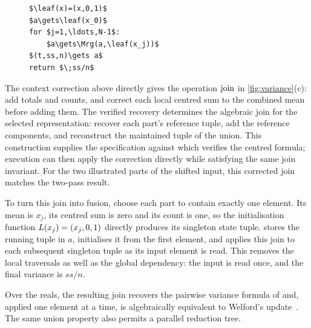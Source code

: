 \begin{figure}
\begin{lstlisting}[style=pseudocode,caption={Single pass with maintained states.},label={lst:variance-after}]
$\leaf(x)=(x,0,1)$
$a\gets\leaf(x_0)$
for $j=1,\ldots,N-1$:
    $a\gets\Mrg(a,\leaf(x_j))$
$(t,ss,n)\gets a$
return $\;ss/n$
\end{lstlisting}
\end{figure}
The context correction above directly gives the operation $\operatorname{join}$ in \cref{fig:variance}(c): add totals and counts, and correct each local centred sum to the combined mean before adding them.
The verified recovery determines the algebraic join for the selected representation: recover each part's reference tuple, add the reference components, and reconstruct the maintained tuple of the union.
This construction supplies the specification against which \sys verifies the centred formula; execution can then apply the correction directly while satisfying the same join invariant.
For the two illustrated parts of the shifted input, this corrected join matches the two-pass result.

To turn this join into fusion, choose each part to contain exactly one element.
Its mean is $x_j$, its centred sum is zero and its count is one, so the initialisation function $L(x_j)=(x_j,0,1)$ directly produces its singleton state tuple.
 stores the running tuple in $a$, initialises it from the first element, and applies this join to each subsequent singleton tuple as its input element is read.
This removes the local traversals as well as the global dependency: the input is read once, and the final variance is $ss/n$.

Over the reals, the resulting join recovers the pairwise variance formula of \citet{chan} and, applied one element at a time, is algebraically equivalent to Welford's update~\citep{welford}.
The same union property also permits a parallel reduction tree.
\endgroup
